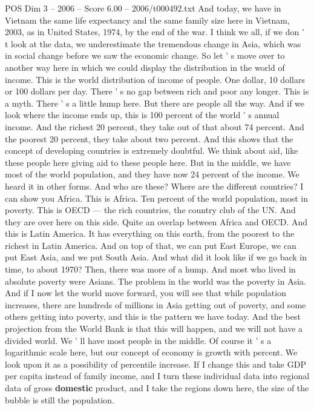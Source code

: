 \begin{textsample}{POS Dim 3 – 2006 – Score 6.00 – 2006/t000492.txt}
And today, we have in Vietnam the same life expectancy and the same family size here in Vietnam, 2003, as in United States, 1974, by the end of the war.
I think we all, if we don ' t look at the data, we underestimate the tremendous change in Asia, which was in social change before we saw the economic change.
So let ' s move over to another way here in which we could display the distribution in the world of income.
This is the world distribution of income of people.
One dollar, 10 dollars or 100 dollars per day.
There ' s no gap between rich and poor any longer.
This is a myth.
There ' s a little hump here.
But there are people all the way.
And if we look where the income ends up, this is 100 percent of the world ' s annual income.
And the richest 20 percent, they take out of that about 74 percent.
And the poorest 20 percent, they take about two percent.
And this shows that the concept of developing countries is extremely doubtful.
We think about aid, like these people here giving aid to these people here.
But in the middle, we have most of the world population, and they have now 24 percent of the income.
We heard it in other forms.
And who are these?
Where are the different countries?
I can show you Africa.
This is Africa.
Ten percent of the world population, most in poverty.
This is OECD — the rich countries, the country club of the UN.
And they are over here on this side.
Quite an overlap between Africa and OECD.
And this is Latin America.
It has everything on this earth, from the poorest to the richest in Latin America.
And on top of that, we can put East Europe, we can put East Asia, and we put South Asia.
And what did it look like if we go back in time, to about 1970?
Then, there was more of a hump.
And most who lived in absolute poverty were Asians.
The problem in the world was the poverty in Asia.
And if I now let the world move forward, you will see that while population increases, there are hundreds of millions in Asia getting out of poverty, and some others getting into poverty, and this is the pattern we have today.
And the best projection from the World Bank is that this will happen, and we will not have a divided world.
We ' ll have most people in the middle.
Of course it ' s a logarithmic scale here, but our concept of economy is growth with percent.
We look upon it as a possibility of percentile increase.
If I change this and take GDP per capita instead of family income, and I turn these individual data into regional data of gross \textbf{domestic} product, and I take the regions down here, the size of the bubble is still the population.

\end{textsample}
